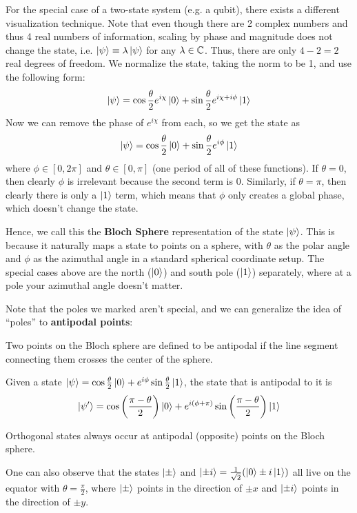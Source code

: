 For the special case of a two-state system (e.g. a qubit), there exists a different visualization technique. Note that even though there are 2 complex numbers and thus 4 real
numbers of information, scaling by phase and magnitude does not change the state, i.e. $\ket{\psi} \equiv \lambda \ket{\psi}$ for any $\lambda \in \operatorname{\mathbb{C}}$. Thus,
there are only $4 - 2 = 2$ real degrees of freedom. We normalize the state, taking the norm to be 1, and use the following form:
\[ \ket{\psi} = \cos \frac{\theta}{2} e^{i \chi} \ket{0} + \sin \frac{\theta}{2} e^{i \chi + i \phi} \ket{1} \]
Now we can remove the phase of $e^{i \chi}$ from each, so we get the state as 
\[ \ket{\psi} = \cos \frac{\theta}{2} \ket{0} + \sin \frac{\theta}{2} e^{i \phi} \ket{1} \]
where $\phi \in [0, 2\pi]$ and $\theta \in [0, \pi]$ (one period of all of these functions). If $\theta = 0$, then clearly $\phi$ is irrelevant because the second term is 0.
Similarly, if $\theta = \pi$, then clearly there is only a $\ket{1}$ term, which means that $\phi$ only creates a global phase, which doesn't change the state.

Hence, we call this the \textbf{Bloch Sphere} representation of the state $\ket{\psi}$. This is because it naturally maps a state to points on a sphere,
with $\theta$ as the polar angle and $\phi$ as the azimuthal angle in a standard spherical coordinate setup. The special cases above are the north ($\ket{0}$) and south pole ($\ket{1}$) separately, where at a pole your azimuthal angle doesn't matter.

Note that the poles we marked aren't special, and we can generalize the idea of ``poles'' to \textbf{antipodal points}:
\begin{definition}[Antipodal]
    Two points on the Bloch sphere are defined to be antipodal if the line segment connecting them crosses the center of the sphere.
\end{definition}
\begin{note}
    Given a state $\ket{\psi} = \cos \frac{\theta}{2} \ket 0 + e^{i \phi} \sin \frac{\theta}{2} \ket 1$, the state that is antipodal to it is 
    \[\ket{\psi^{\prime}} = \cos\left(\frac{\pi - \theta}{2}\right) \ket 0 + e^{i(\phi + \pi)} \sin\left(\frac{\pi - \theta}{2}\right) \ket 1\]
\end{note}
\begin{note}
    Orthogonal states always occur at antipodal (opposite) points on the Bloch sphere.
\end{note}
One can also observe that the states $\ket{\pm}$ and $\ket{\pm i} = \frac{1}{\sqrt{2}} \qty(\ket{0} \pm i \ket{1})$ all live on the equator with $\theta = \frac{\pi}{2}$,
where $\ket{\pm}$ points in the direction of $\pm x$ and $\ket{\pm i}$ points in the direction of $\pm y$.

